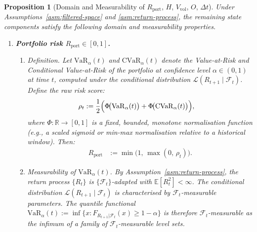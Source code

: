 \documentclass[12pt,openany]{book}
\newcommand{\calF}{\mathcal{F}}
\newcommand{\E}{\mathbb{E}}
\numberwithin{equation}{chapter}
\theoremstyle{plain}
\newtheorem{proposition}[theorem]{Proposition}
\theoremstyle{definition}
\theoremstyle{remark}
\numberwithin{equation}{chapter}
\theoremstyle{plain}
\begin{document}
\begin{proposition}[Domain and Measurability of $R_{\mathrm{port}}$,
  $H$, $V_{\mathrm{vol}}$, $O$, $\Delta t$]
\label{prop:remaining-components}
Under Assumptions~\ref{asm:filtered-space} and
\ref{asm:return-process}, the remaining state components satisfy the
following domain and measurability properties.
\begin{enumerate}

  \item \textbf{Portfolio risk $R_{\mathrm{port}} \in [0,1]$.}

    \begin{enumerate}
      \item \emph{Definition.}
        Let $\mathrm{VaR}_\alpha(t)$ and $\mathrm{CVaR}_\alpha(t)$
        denote the Value-at-Risk and Conditional Value-at-Risk of
        the portfolio at confidence level $\alpha \in (0,1)$ at
        time $t$, computed under the conditional distribution
        $\mathcal{L}(R_{t+1} \mid \calF_t)$.
        Define the raw risk score:
        \begin{align}
          \rho_t
            &:= \frac{1}{2}
               \Bigl(
                 \Phi\!\bigl(\mathrm{VaR}_\alpha(t)\bigr)
                 + \Phi\!\bigl(\mathrm{CVaR}_\alpha(t)\bigr)
               \Bigr),
        \end{align}
        where $\Phi : \mathbb{R} \to [0,1]$ is a fixed, bounded,
        monotone normalisation function (e.g., a scaled sigmoid or
        min-max normalisation relative to a historical window).
        Then:
        \begin{align}
          R_{\mathrm{port}}
            &:= \min\!\bigl(1,\, \max(0,\, \rho_t)\bigr).
        \end{align}

      \item \emph{Measurability of $\mathrm{VaR}_\alpha(t)$.}
        By Assumption~\ref{asm:return-process}, the return process
        $\{R_t\}$ is $\{\calF_t\}$-adapted with
        $\E[R_t^2] < \infty$.
        The conditional distribution
        $\mathcal{L}(R_{t+1} \mid \calF_t)$ is characterised by
        $\calF_t$-measurable parameters.
        The quantile functional
        $\mathrm{VaR}_\alpha(t)
          := \inf\{x : F_{R_{t+1}|\calF_t}(x) \geq 1-\alpha\}$
        is therefore $\calF_t$-measurable as the infimum of a
        family of $\calF_t$-measurable level sets.


\end{enumerate}
\end{enumerate}
\end{proposition}
\end{document}
